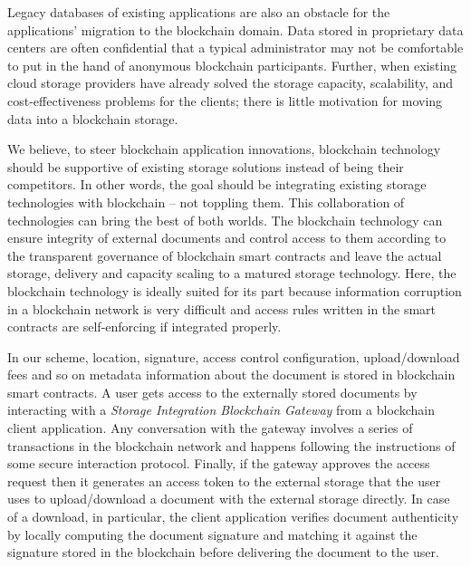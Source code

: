 \documentclass[conference]{IEEEtran}
\begin{document}
Legacy databases of existing applications are also an obstacle for the applications' migration to the blockchain domain. Data stored in proprietary data centers are often confidential that a typical administrator may not be comfortable to put in the hand of anonymous blockchain participants. Further, when existing cloud storage providers \cite{Murty:2008:PAW:1407893} \cite{googleCloud} have already solved the storage capacity, scalability, and cost-effectiveness problems for the clients; there is little motivation for moving data into a blockchain storage.     

We believe, to steer blockchain application innovations, blockchain technology should be supportive of existing storage solutions instead of being their competitors. In other words, the goal should be integrating existing storage technologies with blockchain -- not toppling them. This collaboration of technologies can bring the best of both worlds. The blockchain technology can ensure integrity of external documents and control access to them according to the transparent governance of blockchain smart contracts and leave the actual storage, delivery and capacity scaling to a matured storage technology. Here, the blockchain technology is ideally suited for its part because information corruption in a blockchain network is very difficult and access rules written in the smart contracts are self-enforcing if integrated properly.

In our scheme, location, signature, access control configuration, upload/download fees and so on metadata information about the document is stored in blockchain smart contracts. A user gets access to the externally stored documents by interacting with a \textit{Storage Integration Blockchain Gateway} from a blockchain client application. Any conversation with the gateway involves a series of transactions in the blockchain network and happens following the instructions of some secure interaction protocol. Finally, if the gateway approves the access request then it generates an access token to the external storage that the user uses to upload/download a document with the external storage directly. In case of a download, in particular, the client application verifies document authenticity by locally computing the document signature and matching it against the signature stored in the blockchain before delivering the document to the user. 
\end{document}
